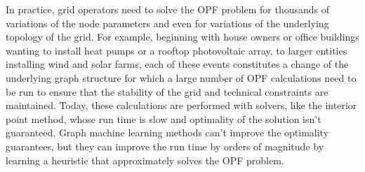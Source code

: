 In practice, grid operators need to solve the OPF problem for thousands of variations of the node parameters and even for variations of the
underlying topology of the grid.
For example, beginning with house owners or office buildings wanting to install heat pumps or a rooftop photovoltaic array,
to larger entities installing wind and solar farms, each of these events constitutes a change of the underlying graph structure for
which a large number of OPF calculations need to be run to ensure that the stability of the grid and technical constraints are maintained.
Today, these calculations are performed with solvers, like the interior point method, whose run time is slow and optimality of
the solution isn't guaranteed\cite{cain2012history}.
Graph machine learning methods can't improve the optimality guarantees, but they can improve the run time by orders of magnitude by learning a heuristic that approximately solves the OPF problem.